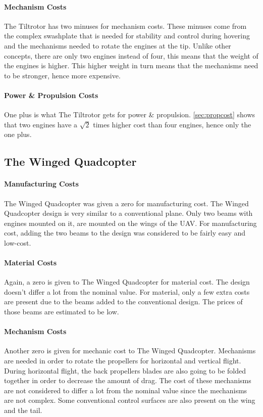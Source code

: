 \paragraph{Mechanism Costs}
The Tiltrotor has two minuses for mechanism costs. These minuses come from the complex swashplate that is needed for stability and control during hovering and the mechanisms needed to rotate the engines at the tip. Unlike other concepts, there are only two engines instead of four, this means that the weight of the engines is higher. This higher weight in turn means that the mechanisms need to be stronger, hence more expensive.

\paragraph{Power \& Propulsion Costs}
One plus is what The Tiltrotor gets for power \& propulsion. \autoref{sec:propcost} shows that two engines have a $\sqrt{2}$ times higher cost than four engines, hence only the one plus.


\subsection{The Winged Quadcopter}

\paragraph{Manufacturing Costs} 
The Winged Quadcopter was given a zero for manufacturing cost. The Winged Quadcopter design is very similar to a conventional plane. Only two beams with engines mounted on it, are mounted on the wings of the UAV. For manufacturing cost, adding the two beams to the design was considered to be fairly easy and low-cost.

\paragraph{Material Costs}
Again, a zero is given to The Winged Quadcopter for material cost. The design doesn't differ a lot from the nominal value. For material, only a few extra costs are present due to the beams added to the conventional design. The prices of those beams are estimated to be low.

\paragraph{Mechanism Costs}
Another zero is given for mechanic cost to The Winged Quadcopter. Mechanisms are needed in order to rotate the propellers for horizontal and vertical flight. During horizontal flight, the back propellers blades are also going to be folded together in order to decrease the amount of drag. The cost of these mechanisms are not considered to differ a lot from the nominal value since the mechanisms are not complex.  Some conventional control surfaces are also present on the wing and the tail.

